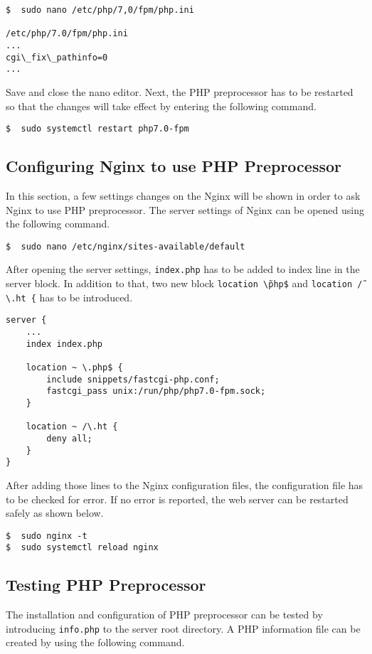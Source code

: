 \begin{lstlisting}
$  sudo nano /etc/php/7,0/fpm/php.ini

/etc/php/7.0/fpm/php.ini
...
cgi\_fix\_pathinfo=0
...
\end{lstlisting}

Save and close the nano editor. Next, the PHP preprocessor has to be restarted so that the changes will take effect by entering the following command.

\begin{lstlisting}
$  sudo systemctl restart php7.0-fpm
\end{lstlisting}

\subsection{Configuring Nginx to use PHP Preprocessor}
In this section, a few settings changes on the Nginx will be shown in order to ask Nginx to use PHP preprocessor. The server settings of Nginx can be opened using the following command.

\begin{lstlisting}
$  sudo nano /etc/nginx/sites-available/default
\end{lstlisting}

After opening the server settings, \texttt{index.php} has to be added to index line in the server block. In addition to that, two new block \texttt{location \~\textbackslash php\$} and \texttt{location \~/\textbackslash .ht \{} has to be introduced.

\begin{lstlisting}
server {
    ...
    index index.php

    location ~ \.php$ {
        include snippets/fastcgi-php.conf;
        fastcgi_pass unix:/run/php/php7.0-fpm.sock;
    }

    location ~ /\.ht {
        deny all;
    }
}
\end{lstlisting}

After adding those lines to the Nginx configuration files, the configuration file has to be checked for error. If no error is reported, the web server can be restarted safely as shown below.

\begin{lstlisting}
$  sudo nginx -t
$  sudo systemctl reload nginx
\end{lstlisting}

\subsection{Testing PHP Preprocessor}
The installation and configuration of PHP preprocessor can be tested by introducing \texttt{info.php} to the server root directory. A PHP information file can be created by using the following command.

